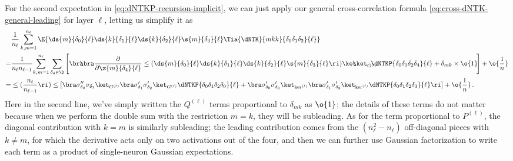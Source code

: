 For the second expectation in \eqref{eq:dNTKP-recursion-implicit}, we can just apply our general cross-correlation formula \eqref{eq:cross-dNTK-general-leading} for layer $\ell$, letting us simplify it as
\begin{align}
&\frac{1}{n_{\ell}}\sum_{k,m=1}^{n_{\ell}}\E{\ds{m}{\delta_0}{\ell}\ds{k}{\delta_1}{\ell}\ds{k}{\delta_2}{\ell}\s{m}{\delta_3}{\ell}\Tia{\dNTK}{mkk}{\delta_0\delta_1\delta_2}{\ell}}\, \\
=&\frac{1}{n_{\ell}n_{\ell-1}}\!\sum_{k,m=1}^{n_{\ell}}\sum_{\delta_4\in\D}\Bigg[\bra\!\!\!\bra\frac{\partial}{\partial \z{m}{\delta_4}{\ell}}\le(\ds{m}{\delta_0}{\ell}\ds{k}{\delta_1}{\ell}\ds{k}{\delta_2}{\ell}\s{m}{\delta_3}{\ell}\ri)\ket\!\!\!\ket_{G^{(\ell)}}\!\!\!\!\!\!\dNTKP{\delta_0\delta_1\delta_2\delta_4}{\ell}+\delta_{mk}\times\o{1}\!\Bigg]+\o{\frac{1}{n}}\, \notag\\
=&\le(\frac{n_{\ell}}{n_{\ell-1}}\ri)\le[\bra\sigma^{\prime\prime}_{\delta_0}\sigma_{\delta_3}\ket_{G^{(\ell)}}\bra\sigma^{\prime}_{\delta_1}\sigma^{\prime}_{\delta_2}\ket_{G^{(\ell)}}\dNTKP{\delta_0\delta_1\delta_2\delta_0}{\ell}+\bra\sigma^{\prime}_{\delta_0}\sigma^{\prime}_{\delta_3}\ket_{\ker^{(\ell)}}\bra\sigma^{\prime}_{\delta_1}\sigma^{\prime}_{\delta_2}\ket_{\ker^{(\ell)}}\dNTKP{\delta_0\delta_1\delta_2\delta_3}{\ell}\ri]+\o{\frac{1}{n}}\, .\notag
\end{align}
Here in the second line, we've simply written the $Q^{(\ell)}$ terms proportional to $\delta_{mk}$ as $\o{1}$; the details of these terms do not matter because when we perform the double sum with the restriction  $m=k$, they will be subleading. As for the term proportional to $P^{(\ell)}$, the diagonal contribution with $k=m$ is similarly subleading; the leading contribution comes from the $(n_{\ell}^2-n_{\ell})$ off-diagonal pieces with $k\ne m$, for which the derivative acts only on two activations out of the four, and then we can further use Gaussian factorization to write each term as a product of single-neuron Gaussian expectations. 


